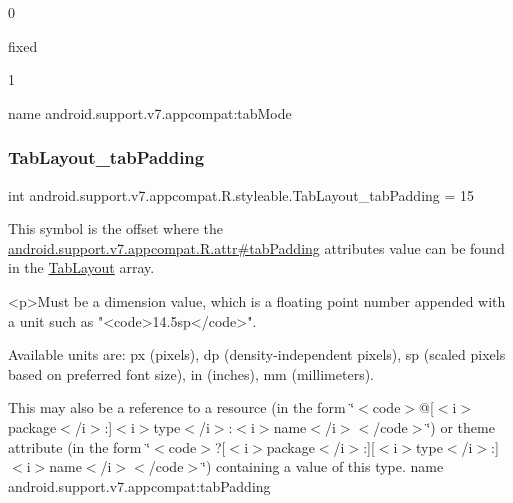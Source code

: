 0

{\ttfamily fixed}

1

name android.\+support.\+v7.\+appcompat\+:tab\+Mode \mbox{\label{classandroid_1_1support_1_1v7_1_1appcompat_1_1R_1_1styleable_a97f140ed7f4cb71b4c00309d063b2aa7}} 
\subsubsection{\texorpdfstring{Tab\+Layout\+\_\+tab\+Padding}{TabLayout\_tabPadding}}
{\footnotesize\ttfamily int android.\+support.\+v7.\+appcompat.\+R.\+styleable.\+Tab\+Layout\+\_\+tab\+Padding = 15\hspace{0.3cm}{\ttfamily [static]}}

This symbol is the offset where the \hyperlink{classandroid_1_1support_1_1v7_1_1appcompat_1_1R_1_1attr_ac37623bb19deedc0d9bdba8edec8c166}{android.\+support.\+v7.\+appcompat.\+R.\+attr\#tab\+Padding} attribute\textquotesingle{}s value can be found in the \hyperlink{classandroid_1_1support_1_1v7_1_1appcompat_1_1R_1_1styleable_a3c85d0c4cebbccf5b1a16ecfe13938ca}{Tab\+Layout} array.

\begin{DoxyVerb}      <p>Must be a dimension value, which is a floating point number appended with a unit such as "<code>14.5sp</code>".
\end{DoxyVerb}
 Available units are\+: px (pixels), dp (density-\/independent pixels), sp (scaled pixels based on preferred font size), in (inches), mm (millimeters). 

This may also be a reference to a resource (in the form \char`\"{}$<$code$>$@\mbox{[}$<$i$>$package$<$/i$>$\+:\mbox{]}$<$i$>$type$<$/i$>$\+:$<$i$>$name$<$/i$>$$<$/code$>$\char`\"{}) or theme attribute (in the form \char`\"{}$<$code$>$?\mbox{[}$<$i$>$package$<$/i$>$\+:\mbox{]}\mbox{[}$<$i$>$type$<$/i$>$\+:\mbox{]}$<$i$>$name$<$/i$>$$<$/code$>$\char`\"{}) containing a value of this type.  name android.\+support.\+v7.\+appcompat\+:tab\+Padding \mbox{\label{classandroid_1_1support_1_1v7_1_1appcompat_1_1R_1_1styleable_acff2ca0891fae17b26046ac2678216ac}} 
